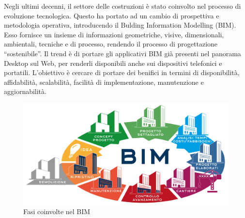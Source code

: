Negli ultimi decenni, il settore delle costruzioni è stato coinvolto nel processo di evoluzione tecnologica.
Questo ha portato ad un cambio di prospettiva e metodologia operativa, introducendo il Bulding Information Modelling (BIM).
Esso fornisce un insieme di informazioni geometriche, visive, dimensionali, ambientali, tecniche e di processo, rendendo
il processo di progettazione ``sostenibile''.
Il trend è di portare gli applicativi BIM già presenti nel panorama Desktop sul Web, per renderli disponibili anche
sui dispositivi telefonici e portatili. L'obiettivo è cercare di portare dei benifici in termini di disponibilità, affidabilità,
scalabilità, facilità di implementazione, manutenzione e aggiornabilità.

\begin{figure}[htbp] %
   \centering
   \includegraphics[width=1\linewidth]{images/bim}
   \caption{Fasi coinvolte nel BIM}
   \label{fig:bim}
\end{figure}
\newpage
